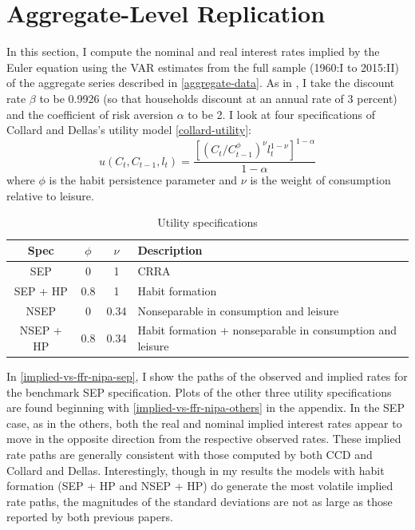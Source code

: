 \section{Aggregate-Level Replication}
In this section, I compute the nominal and real interest rates implied by the Euler equation using the VAR estimates from the full sample (1960:I to 2015:II) of the aggregate series described in \autoref{aggregate-data}. As in \cite{collard11}, I take the discount rate $\beta$ to be 0.9926 (so that households discount at an annual rate of 3 percent) and the coefficient of risk aversion $\alpha$ to be 2. I look at four specifications of Collard and Dellas's utility model \eqref{collard-utility}:
$$u(C_t, C_{t-1}, l_t) = \frac{[(C_t/C_{t-1}^\phi)^\nu l_t^{1-\nu}]^{1-\alpha}}{1-\alpha}$$
where $\phi$ is the habit persistence parameter and $\nu$ is the weight of consumption relative to leisure.

\begin{table}[H]
\centering
\caption{Utility specifications}
\begin{tabular}{cccl} \hline
Spec      & $\phi$ & $\nu$  & Description \\ \hline
SEP       & 0      & 1      & CRRA \\
SEP + HP  & 0.8    & 1      & Habit formation \\
NSEP      & 0      & 0.34   & Nonseparable in consumption and leisure \\
NSEP + HP & 0.8    & 0.34   & Habit formation + nonseparable in consumption and leisure\\ \hline
\end{tabular}
\end{table}

In \autoref{implied-vs-ffr-nipa-sep}, I show the paths of the observed and implied rates for the benchmark SEP specification. Plots of the other three utility specifications are found beginning with \autoref{implied-vs-ffr-nipa-others} in the appendix. In the SEP case, as in the others, both the real and nominal implied interest rates appear to move in the opposite direction from the respective observed rates. These implied rate paths are generally consistent with those computed by both CCD and Collard and Dellas. Interestingly, though in my results the models with habit formation (SEP + HP and NSEP + HP) do generate the most volatile implied rate paths, the magnitudes of the standard deviations are not as large as those reported by both previous papers.

